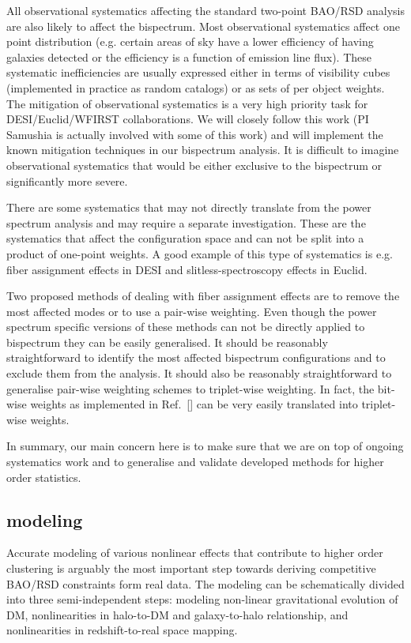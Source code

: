 All observational systematics affecting the standard two-point BAO/RSD analysis
are also likely to affect the bispectrum. Most observational systematics affect
one point distribution (e.g. certain areas of sky have a lower efficiency of
having galaxies detected or the efficiency is a function of emission line
flux). These systematic inefficiencies are usually expressed either in terms of
visibility cubes (implemented in practice as random catalogs) or as sets of
per object weights. The mitigation of observational systematics is a very high
priority task for DESI/Euclid/WFIRST collaborations. We will closely follow
this work (PI Samushia is actually involved with some of this work) and will
implement the known mitigation techniques in our bispectrum analysis. It is
difficult to imagine observational systematics that would be either exclusive
to the bispectrum or significantly more severe.

There are some systematics that may not directly translate from the power
spectrum analysis and may require a separate investigation. These are the
systematics that affect the configuration space and can not be split into a
product of one-point weights. A good example of this type of systematics is
e.g. fiber assignment effects in DESI and slitless-spectroscopy effects in
Euclid.

Two proposed methods of dealing with fiber assignment effects are to remove the
most affected modes or to use a pair-wise weighting. Even though the power
spectrum specific versions of these methods can not be directly applied to
bispectrum they can be easily generalised. It should be reasonably
straightforward to identify the most affected bispectrum configurations and to
exclude them from the analysis. It should also be reasonably straightforward
to generalise pair-wise weighting schemes to triplet-wise weighting. In fact,
the bit-wise weights as implemented in Ref.~[] can be very easily translated
into triplet-wise weights.

In summary, our main concern here is to make sure that we are on top of ongoing
systematics work and to generalise and validate developed methods for higher
order statistics.

\subsection*{modeling}

Accurate modeling of various nonlinear effects that contribute to higher order
clustering is arguably the most important step towards deriving competitive
BAO/RSD constraints form real data. The modeling can be schematically divided
into three semi-independent steps: modeling non-linear gravitational evolution
of DM, nonlinearities in halo-to-DM and galaxy-to-halo relationship, and
nonlinearities in redshift-to-real space mapping.

